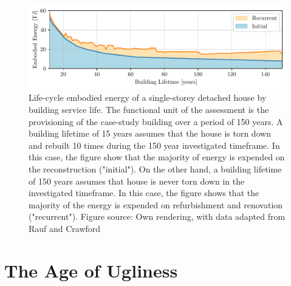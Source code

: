 \documentclass{article}
\begin{document}
\begin{figure}[ht!]
    \includegraphics[width=\textwidth]{./figures/building_embodied_energy.pdf}
    \vspace{-5mm}
    \caption{
        Life-cycle embodied energy of a single-storey detached house by building service life. The functional unit of the assessment is the provisioning of the case-study building over a period of 150 years. A building lifetime of 15 years assumes that the house is torn down and rebuilt 10 times during the 150 year investigated timeframe. In this case, the figure show that the majority of energy is expended on the reconstruction ("initial"). On the other hand, a building lifetime of 150 years assumes that house is never torn down in the investigated timeframe. In this case, the figure shows that the majority of the energy is expended on refurbishment and renovation ("recurrent").
        \newline Figure source: Own rendering, with data adapted from Rauf and Crawford \cite[Figure 5]{rauf_building_2015}
    }
    \label{fig:energy}
\end{figure}

\clearpage
\section{The Age of Ugliness}
\label{sec:ugliness}
\end{document}
